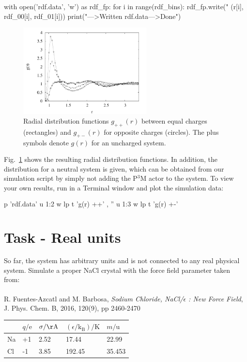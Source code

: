 \documentclass[
a4paper,                        %
11pt,                           %
twoside,                        %
footsepline,                    %
headsepline,                    %
headexclude,                    %
footexclude,                    %
pagesize,                       %
]{scrartcl}
\begin{document}
\begin{pypresso}
with open('rdf.data', 'w') as rdf_fp:
    for i in range(rdf_bins):
        rdf_fp.write("%
                (r[i], rdf_00[i], rdf_01[i]))
print("\n--->Written rdf.data\n--->Done")
\end{pypresso}

\begin{figure}[tb]
  \centering
  \includegraphics[width=0.6\textwidth]{figures/nacl-rdf}
  \caption{Radial distribution functions $g_{++}(r)$ between equal
    charges (rectangles) and $g_{+-}(r)$ for opposite charges
    (circles). The plus symbols denote $g(r)$ for an uncharged
    system.}
  \label{fig:rdf}
\end{figure}

Fig.~\ref{fig:rdf} shows the resulting radial distribution functions. In
addition, the distribution for a neutral system is given, which can be obtained
from our simulation script by simply not adding the P$^3$M actor to the system.
To view your own results, run  in a Terminal window
and plot the simulation data:

\begin{pypresso}
p 'rdf.data' u 1:2 w lp t 'g(r) ++' , '' u 1:3 w lp t 'g(r) +-'
\end{pypresso}

\section{Task - Real units}

So far, the system has arbitrary units and is not connected to any real physical system.
Simulate a proper NaCl crystal with the force field parameter taken from:\\
\\
\noindent R. Fuentes-Azcatl and M. Barbosa, \emph{Sodium Chloride, NaCl/$\epsilon$ : New Force Field},\\ J. Phys. Chem. B, 2016, 120(9), pp 2460-2470
\begin{table}[h]
    \centering
    \begin{tabular}{l|llll}
           & $q/\mathrm{e}$  & $\sigma / \mathrm{\AA} $ & $(\epsilon /\mathrm{k_B})/\mathrm{K}$ & $m/\mathrm{u}$  \\
        \hline
        Na & +1     & 2.52          & 17.44                 & 22.99  \\
        \hline
        Cl & -1     & 3.85          & 192.45                & 35.453 
    \end{tabular}
\end{table}
\end{document}
